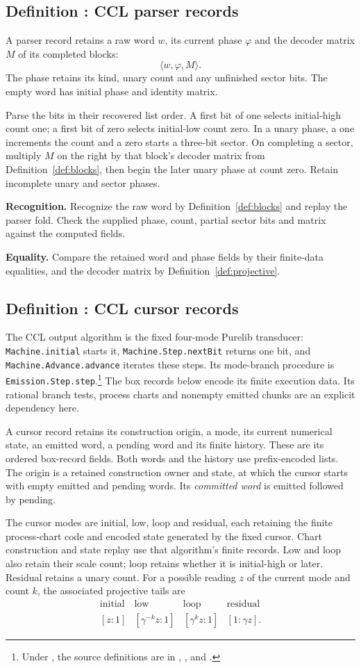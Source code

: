 \documentclass[11pt]{article}
\newcounter{definition}
\newcommand{\entry}[2]{%
  \refstepcounter{definition}\subsection*{#1 \thedefinition: #2}}
\newcommand{\definition}[1]{\entry{Definition}{#1}}
\newcommand{\checks}[2]{\begin{samepage}\par
  \textbf{Recognition.} #1\par\nopagebreak[4]
  \textbf{Equality.} #2\par\end{samepage}}
\begin{document}
\definition{CCL parser records}\label{def:ccl-parser}
A parser record retains a raw word $w$, its current phase $\varphi$ and
the decoder matrix $M$ of its completed blocks:
\[
                         \langle w,\varphi,M\rangle.
\]
The phase retains its kind, unary count and any unfinished sector bits.
The empty word has initial phase and identity matrix.

Parse the bits in their recovered list order. A first bit of one selects
initial-high count one; a first bit of zero selects initial-low count zero.
In a unary phase, a one increments the count and a zero starts a three-bit
sector. On completing a sector, multiply $M$ on the right by that block's
decoder matrix from Definition~\ref{def:blocks}, then begin the later unary
phase at count zero. Retain incomplete unary and sector phases.

\checks{Recognize the raw word by Definition~\ref{def:blocks} and replay
the parser fold. Check the supplied phase, count, partial sector bits and
matrix against the computed fields.}
{Compare the retained word and phase fields by their finite-data
equalities, and the decoder matrix by Definition~\ref{def:projective}.}

\definition{CCL cursor records}\label{def:ccl-cursor}
The CCL output algorithm is the fixed four-mode Purelib transducer:
\texttt{Machine.initial} starts it, \texttt{Machine.Step.nextBit} returns
one bit, and \texttt{Machine.Advance.advance} iterates these steps.
Its mode-branch procedure is
\texttt{Emission.Step.step}.\footnote{Under
, the source definitions are in
, ,
 and .}
The box records below encode its finite execution data. Its rational
branch tests, process charts and nonempty emitted chunks are an explicit
dependency here.

A cursor record retains its construction origin, a mode, its current
numerical state, an emitted word, a pending word and its finite history.
These are its ordered box-record fields. Both words and the history use
prefix-encoded lists. The origin is a retained construction owner and
state, at which the cursor starts with empty emitted and pending words.
Its \emph{committed word} is emitted followed by pending.

The cursor modes are initial, low, loop and residual, each retaining the
finite process-chart code and encoded state generated by the fixed cursor.
Chart construction and state replay use that algorithm's finite records.
Low and loop also retain their scale count;
loop retains whether it is initial-high or later. Residual retains a
unary count. For a possible reading $z$ of the current mode and count $k$,
the associated projective tails are
\[
\begin{array}{c|c|c|c}
\text{initial}&\text{low}&\text{loop}&\text{residual}\\ \hline
[z:1]&[\gamma^{-k}z:1]&[\gamma^kz:1]&[1:\gamma z].
\end{array}
\]
\end{document}

